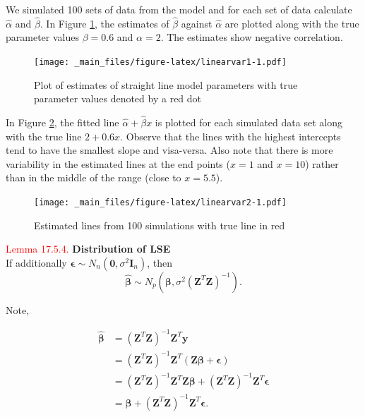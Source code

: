 \documentclass[
]{book}
\begin{document}
We simulated 100 sets of data from the model and for each set of data calculate \(\hat{\alpha}\) and \(\hat{\beta}\). In Figure \ref{fig:linearvar1}, the estimates of \(\hat{\beta}\) against \(\hat{\alpha}\) are plotted along with the true parameter values \(\beta =0.6\) and \(\alpha =2\). The estimates show negative correlation.

\begin{figure}
\centering
\texttt{[image: \_main\_files/figure-latex/linearvar1-1.pdf]}
\caption{\label{fig:linearvar1}Plot of estimates of straight line model parameters with true parameter values denoted by a red dot}
\end{figure}

In Figure \ref{fig:linearvar2}, the fitted line \(\hat{\alpha}+\hat{\beta} x\) is plotted for each simulated data set along with the true line \(2 + 0.6 x\). Observe that the lines with the highest intercepts tend to have the smallest slope and visa-versa. Also note that there is more variability in the estimated lines at the end points (\(x=1\) and \(x=10\)) rather than in the middle of the range (close to \(x=5.5\)).

\begin{figure}
\centering
\texttt{[image: \_main\_files/figure-latex/linearvar2-1.pdf]}
\caption{\label{fig:linearvar2}Estimated lines from 100 simulations with true line in red}
\end{figure}

\leavevmode{}%
\textcolor{red}{Lemma 17.5.4.}
{\textbf{Distribution of LSE}}\\
If additionally \(\mathbf{\epsilon} \sim N_n(\mathbf{0},\sigma^2 \mathbf{I}_n)\), then
\[\mathbf{\hat{\beta}} \sim N_p \left( \mathbf{\beta},\sigma^2(\mathbf{Z}^T\mathbf{Z})^{-1} \right).\]

\leavevmode{}%
Note,

\begin{align*}
\mathbf{\hat{\beta}} &= (\mathbf{Z}^T\mathbf{Z})^{-1} \mathbf{Z}^T\mathbf{y} \\
&= (\mathbf{Z}^T\mathbf{Z})^{-1} \mathbf{Z}^T (\mathbf{Z}\mathbf{\beta}+\mathbf{\epsilon}) \\
&= (\mathbf{Z}^T\mathbf{Z})^{-1} \mathbf{Z}^T\mathbf{Z}\mathbf{\beta} + (\mathbf{Z}^T\mathbf{Z})^{-1} \mathbf{Z}^T \mathbf{\epsilon} \\
&= \mathbf{\beta} + (\mathbf{Z}^T\mathbf{Z})^{-1} \mathbf{Z}^T \mathbf{\epsilon}.
\end{align*}
\end{document}
